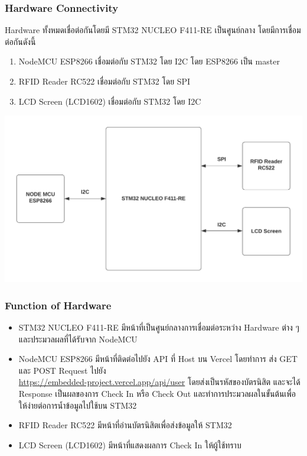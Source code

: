 \documentclass[fontsize=14pt]{extarticle}
\begin{document}
\subsubsection{Hardware Connectivity}
Hardware ทั้งหมดเชื่อต่อกันโดยมี STM32 NUCLEO F411-RE เป็นศูนย์กลาง โดยมีการเชื่อมต่อกันดังนี้
\begin{enumerate}
    \item NodeMCU ESP8266 เชื่อมต่อกับ STM32 โดย I2C โดย ESP8266 เป็น master
    \item RFID Reader RC522 เชื่อมต่อกับ STM32 โดย SPI
    \item LCD Screen (LCD1602) เชื่อมต่อกับ STM32 โดย I2C
\end{enumerate}
\includegraphics[]{Diagram.png}
\subsubsection{Function of Hardware}
\begin{itemize}
    \item STM32 NUCLEO F411-RE มีหน้าที่เป็นศูนย์กลางการเชื่อมต่อระหว่าง Hardware ต่าง ๆ และประมวลผลที่ได้รับจาก NodeMCU
    \item NodeMCU ESP8266 มีหน้าที่ติดต่อไปยัง API ที่ Host บน Vercel  โดยทำการ ส่ง GET และ POST Request ไปยัง \\ \url{https://embedded-project.vercel.app/api/user}  โดยส่งเป็นรหัสของบัตรนิสิต และจะได้ Response เป็นผลของการ Check In หรือ Check Out และทำการประมวลผลในขั้นต้นเพื่อให้ง่ายต่อการน้ำข้อมูลไปใช้บน STM32
    \item RFID Reader RC522 มีหน้าที่อ่านบัตรนิสิตเพื่อส่งข้อมูลให้ STM32
    \item LCD Screen (LCD1602) มีหน้าที่แสดงผลการ Check In ให้ผู้ใช้ทราบ
\end{itemize}
\end{document}
